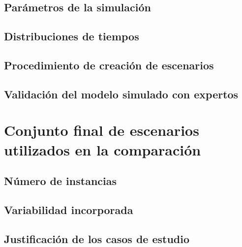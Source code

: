     \subsection{Parámetros de la simulación}
    \subsection{Distribuciones de tiempos}
    \subsection{Procedimiento de creación de escenarios}
    \subsection{Validación del modelo simulado con expertos}

\section{Conjunto final de escenarios utilizados en la comparación}
    \subsection{Número de instancias}
    \subsection{Variabilidad incorporada}
    \subsection{Justificación de los casos de estudio}